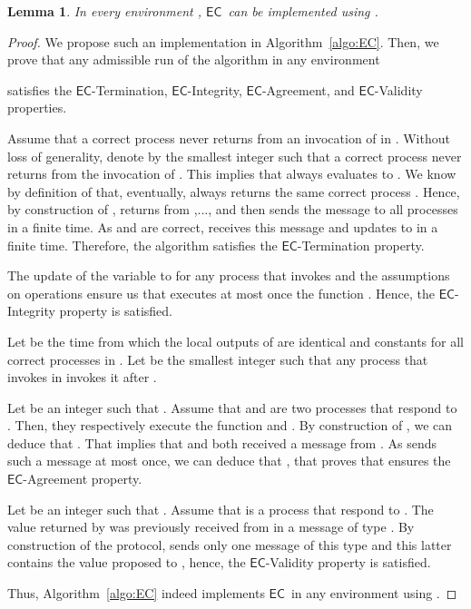 \documentclass[11pt]{article}
\newtheorem{lemma}{Lemma}
\newcommand{\EC}{\ensuremath{\mathsf{EC}}}
\begin{document}
\begin{lemma}\label{lem:SufficiencyOmegaEC}
In every environment , \EC~can be implemented using .
\end{lemma}
\begin{proof}
We propose such an implementation in Algorithm~\ref{algo:EC}. Then, we
prove that any admissible run  of the algorithm in any environment

satisfies the \EC-Termination, \EC-Integrity, \EC-Agreement, and \EC-Validity properties.

Assume that a correct process never returns from an invocation of
 in . Without loss of generality, denote by
 the smallest integer such that a correct process  never
returns from the invocation of . This implies
that  always evaluates  to
. We know by definition of  that, eventually, 
always returns the same correct process . Hence, by construction
of ,  returns from ,...,
 and then sends the message
 to all processes in a finite time. As  and
 are correct,  receives this message and updates
 to  in a finite time. Therefore, the
algorithm satisfies the \EC-Termination property.

The update of the variable  to  for any process 
that invokes  and the assumptions on operations
 ensure us that  executes at most once the
function \linebreak . Hence, the
\EC-Integrity property is satisfied.

Let  be the time from which the local outputs of 
are identical and constants for all correct processes in . Let 
be the smallest integer such that any process that invokes
 in  invokes it after .

Let  be an integer such that . Assume that  and
 are two processes that respond to . Then,
they respectively execute the function
 and
. By construction of , we
can deduce that . That implies that  and
 both received a message  from . As 
sends such a message at most once, we can deduce that
, that proves that ensures
the \EC-Agreement property.

Let  be an integer such that . Assume that  is
a process that respond to . The value returned
by  was previously received from  in a message of type
. By construction of the protocol,  sends only one
message of this type and this latter contains the value proposed to
, hence, the \EC-Validity property is satisfied.

Thus, Algorithm~\ref{algo:EC} indeed implements \EC~in any
environment using .
\end{proof}
\end{document}
